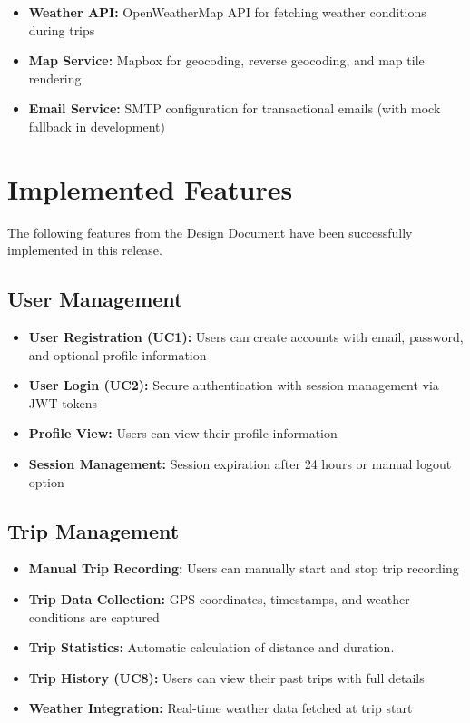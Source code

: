 \begin{itemize}
    \item \textbf{Weather API:} OpenWeatherMap API for fetching weather conditions during trips
    \item \textbf{Map Service:} Mapbox for geocoding, reverse geocoding, and map tile rendering
    \item \textbf{Email Service:} SMTP configuration for transactional emails (with mock fallback in development)
\end{itemize}

\section{Implemented Features}
\label{sec:implemented_features}

The following features from the Design Document have been successfully implemented in this release.

\subsection{User Management}
\label{subsec:impl_user_mgmt}

\begin{itemize}
    \item \textbf{User Registration (UC1):} Users can create accounts with email, password, and optional profile information
    \item \textbf{User Login (UC2):} Secure authentication with session management via JWT tokens
    \item \textbf{Profile View:} Users can view their profile information
    \item \textbf{Session Management:} Session expiration after 24 hours or manual logout option
\end{itemize}

\subsection{Trip Management}
\label{subsec:impl_trip_mgmt}

\begin{itemize}
    \item \textbf{Manual Trip Recording:} Users can manually start and stop trip recording
    \item \textbf{Trip Data Collection:} GPS coordinates, timestamps, and weather conditions are captured
    \item \textbf{Trip Statistics:} Automatic calculation of distance and duration.
    \item \textbf{Trip History (UC8):} Users can view their past trips with full details
    \item \textbf{Weather Integration:} Real-time weather data fetched at trip start
\end{itemize}

